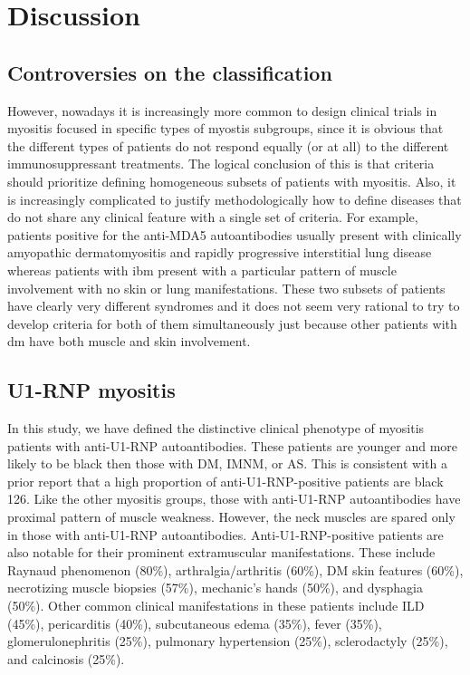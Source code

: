 \chapter{Discussion}

\section{Controversies on the classification}
However, nowadays it is increasingly more common to design clinical trials in myositis focused in specific types of myostis subgroups, since it is obvious that the different types of patients do not respond equally (or at all) to the different immunosuppressant treatments. The logical conclusion of this is that criteria should prioritize defining homogeneous subsets of patients with myositis. Also, it is increasingly complicated to justify methodologically how to define diseases that do not share any clinical feature with a single set of criteria. For example, patients positive for the anti-MDA5 autoantibodies usually present with clinically amyopathic dermatomyositis and rapidly progressive interstitial lung disease whereas patients with \gls{ibm} present with a particular pattern of muscle involvement with no skin or lung manifestations. These two subsets of patients have clearly very different syndromes and it does not seem very rational to try to develop criteria for both of them simultaneously just because other patients with \gls{dm} have both muscle and skin involvement.

\section{U1-RNP myositis}

In this study, we have defined the distinctive clinical phenotype of myositis patients with anti-U1-RNP autoantibodies.  These patients are younger and more likely to be black then those with DM, IMNM, or AS.  This is consistent with a prior report that a high proportion of anti-U1-RNP-positive patients are black 126.  Like the other myositis groups, those with anti-U1-RNP autoantibodies have proximal pattern of muscle weakness.  However, the neck muscles are spared only in those with anti-U1-RNP autoantibodies.  Anti-U1-RNP-positive patients are also notable for their prominent extramuscular manifestations.  These include Raynaud phenomenon (80\%), arthralgia/arthritis (60\%), DM skin features (60\%), necrotizing muscle biopsies (57\%), mechanic’s hands (50\%), and dysphagia (50\%).  Other common clinical manifestations in these patients include ILD (45\%), pericarditis (40\%), subcutaneous edema (35\%), fever (35\%), glomerulonephritis (25\%), pulmonary hypertension (25\%), sclerodactyly (25\%), and calcinosis (25\%).  

